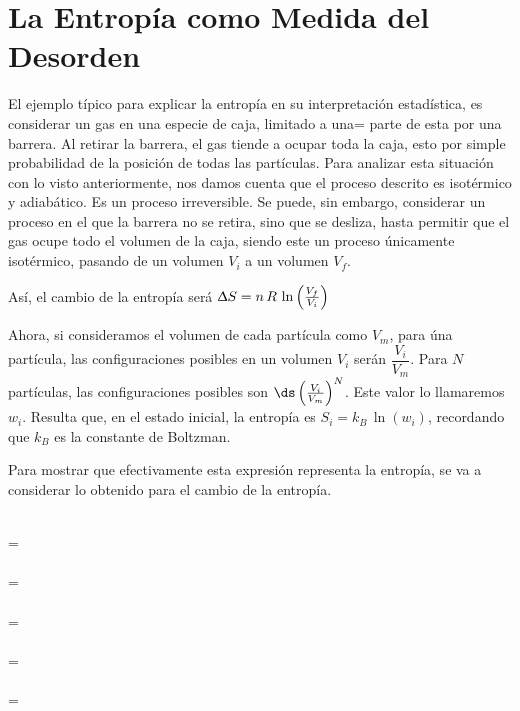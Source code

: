 \section{La Entropía como Medida del Desorden}

El ejemplo típico para explicar la entropía en su interpretación
estadística, es considerar un gas en una especie de caja, limitado a una=
parte de esta por una barrera. Al retirar la barrera, el gas tiende
a ocupar toda la caja, esto por simple probabilidad de la posición de todas
las partículas. Para analizar esta situación con lo visto anteriormente,
nos damos cuenta que el proceso descrito es isotérmico y adiabático. Es un
proceso irreversible. Se puede, sin embargo, considerar un proceso en el que la
barrera no se retira, sino que se desliza, hasta permitir que el gas ocupe todo
el volumen de la caja, siendo este un proceso únicamente isotérmico, pasando
de un volumen $V_i$ a un volumen $V_f$.

Así, el cambio de la entropía será $\Updelta S = n\,R\,\ln\left(\frac{V_f}{V_i}\right)$

Ahora, si consideramos el volumen de cada partícula como $V_m$, para úna partícula,
las configuraciones posibles en un volumen $V_i$ serán $\dfrac{V_i}{V_m}$.
Para $N$ partículas, las configuraciones posibles son $\ds\left(\frac{V_i}{V_m}\right)^N$.
Este valor lo llamaremos $w_i$. Resulta que, en el estado inicial, la entropía
es $S_i = k_B\,\ln(w_i)$, recordando que $k_B$ es la constante de Boltzman.

Para mostrar que efectivamente esta expresión representa la entropía, se va a considerar
lo obtenido para el cambio de la entropía.

\begin{longderivation}
    \\
  =\\
    \\
  =\\
    \\
  =\\
    \\
  =\\
    \\
  =\\
\end{longderivation}